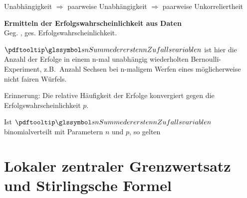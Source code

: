 \begin{bem} 
Unabhängigkeit $\Rightarrow$ paarweise Unabhängigkeit $\Rightarrow$ paarweise Unkorreliertheit
\end{bem}
\begin{bem} 
\end{bem}
\begin{bsp}
    \textbf{Ermitteln der Erfolgswahrscheinlichkeit aus Daten}   \\
    Geg. \ma{\sn}, ges.   Erfolgswahrscheinlichkeit.

    $\sn$ ist hier die Anzahl der Erfolge in einem n-mal unabhängig wiederholten Bernoulli-Experiment,
    z.B.\ Anzahl Sechsen bei n-maligem Werfen eines möglicherweise nicht fairen Würfels.

    Erinnerung: Die relative Häufigkeit  der Erfolge
    konvergiert gegen die Erfolgswahrscheinlichkeit $p$. 
\end{bsp}


\begin{notation} 
\end{notation}

\begin{er} 
Ist $\sn$ binomialverteilt mit Parametern $n$ und $p$, so gelten
\end{er}


\section{Lokaler zentraler Grenzwertsatz und Stirlingsche Formel}

